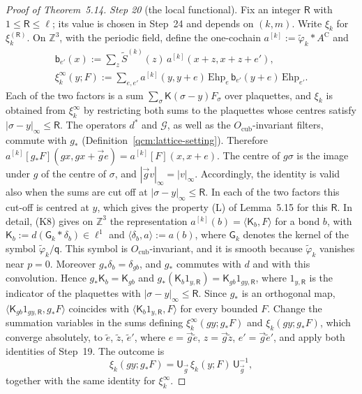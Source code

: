 \documentclass[11pt,letterpaper,reqno]{amsart}
\theoremstyle{definition}
\begin{document}
\begin{proof}[Proof of Theorem~5.14]
\emph{Step 20} (the local functional).
Fix an integer $\mathsf R$ with $1\le\mathsf R\le\ell$; its value is chosen in Step~24 and depends on $(k,m)$.
Write $\xi_k$ for $\xi_k^{(\mathsf R)}$.
On $\mathbb Z^3$, with the periodic field, define the one-cochain $a^{[k]}:=\tilde\varphi_k*A^{\mathrm C}$ and
\begin{gather*}
\mathsf b_{e'}(x):=\sum_z\tilde S^{(k)}(z)\,a^{[k]}(x+z,x+z+e'),\\
\xi_k^\infty(y;F):=\sum_{e,e'}a^{[k]}(y,y+e)\,\mathrm{Ehp}_e\,\mathsf b_{e'}(y+e)\,\mathrm{Ehp}_{e'}.
\end{gather*}
Each of the two factors is a sum $\sum_\sigma\mathsf K(\sigma-y)F_\sigma$ over plaquettes, and $\xi_k$ is obtained from $\xi_k^\infty$ by restricting both sums to the plaquettes whose centres satisfy $|\sigma-y|_\infty\le\mathsf R$.
The operators $d^*$ and $\mathcal G$, as well as the $O_{\mathrm{cub}}$-invariant filters, commute with $g_*$ (Definition~\ref{qcm:lattice-setting}).
Therefore $a^{[k]}[g_*F](gx,gx+\vec ge)=a^{[k]}[F](x,x+e)$.
The centre of $g\sigma$ is the image under $g$ of the centre of $\sigma$, and $|\vec gv|_\infty=|v|_\infty$.
Accordingly, the identity is valid also when the sums are cut off at $|\sigma-y|_\infty\le\mathsf R$.
In each of the two factors this cut-off is centred at $y$, which gives the property (L) of Lemma~5.15 for this $\mathsf R$.
In detail, (K8) gives on $\mathbb Z^3$ the representation $a^{[k]}(b)=\langle\mathsf K_b,F\rangle$ for a bond $b$, with $\mathsf K_b:=d(\mathsf G_k*\delta_b)\in\ell^1$ and $\langle\delta_b,a\rangle:=a(b)$, where $\mathsf G_k$ denotes the kernel of the symbol $\tilde\varphi_k/\mathsf q$.
This symbol is $O_{\mathrm{cub}}$-invariant, and it is smooth because $\tilde\varphi_k$ vanishes near $p=0$.
Moreover $g_*\delta_b=\delta_{gb}$, and $g_*$ commutes with $d$ and with this convolution.
Hence $g_*\mathsf K_b=\mathsf K_{gb}$ and $g_*(\mathsf K_b1_{y,\mathsf R})=\mathsf K_{gb}1_{gy,\mathsf R}$, where $1_{y,\mathsf R}$ is the indicator of the plaquettes with $|\sigma-y|_\infty\le\mathsf R$.
Since $g_*$ is an orthogonal map, $\langle\mathsf K_{gb}1_{gy,\mathsf R},g_*F\rangle$ coincides with $\langle\mathsf K_b1_{y,\mathsf R},F\rangle$ for every bounded $F$.
Change the summation variables in the sums defining $\xi_k^\infty(gy;g_*F)$ and $\xi_k(gy;g_*F)$, which converge absolutely, to $\tilde e$, $\tilde z$, $\tilde e'$, where $e=\vec g\tilde e$, $z=\vec g\tilde z$, $e'=\vec g\tilde e'$, and apply both identities of Step~19.
The outcome is
\begin{equation*}
\xi_k(gy;g_*F)=\mathsf U_{\vec g}\,\xi_k(y;F)\,\mathsf U_{\vec g}^{-1},
\end{equation*}
together with the same identity for $\xi_k^\infty$.


\end{proof}
\end{document}
